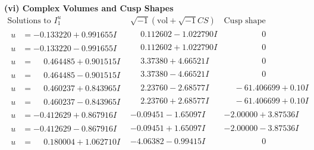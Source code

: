 \documentclass[1p]{elsarticle_modified}
\theoremstyle{definition}
\newcommand{\I}{\sqrt{-1}}
\begin{document}
\newpage\flushleft \textbf{(vi) Complex Volumes and Cusp Shapes}
$$\begin{array}{c|c|c}  
\text{Solutions to }I^u_{1}& \I (\text{vol} + \sqrt{-1}CS) & \text{Cusp shape}\\
 \hline 
\begin{aligned}
u &= -0.133220 + 0.991655 I\end{aligned}
 & \phantom{-}0.112602 - 1.022790 I & \phantom{-0.000000 } 0 \\ \hline\begin{aligned}
u &= -0.133220 - 0.991655 I\end{aligned}
 & \phantom{-}0.112602 + 1.022790 I & \phantom{-0.000000 } 0 \\ \hline\begin{aligned}
u &= \phantom{-}0.464485 + 0.901515 I\end{aligned}
 & \phantom{-}3.37380 + 4.66521 I & \phantom{-0.000000 } 0 \\ \hline\begin{aligned}
u &= \phantom{-}0.464485 - 0.901515 I\end{aligned}
 & \phantom{-}3.37380 - 4.66521 I & \phantom{-0.000000 } 0 \\ \hline\begin{aligned}
u &= \phantom{-}0.460237 + 0.843965 I\end{aligned}
 & \phantom{-}2.23760 - 2.68577 I & \phantom{-}                -6
1.406699 + 0. 10   I\phantom{ +0.000000I} \\ \hline\begin{aligned}
u &= \phantom{-}0.460237 - 0.843965 I\end{aligned}
 & \phantom{-}2.23760 + 2.68577 I & \phantom{-}                -6
1.406699 + 0. 10   I\phantom{ +0.000000I} \\ \hline\begin{aligned}
u &= -0.412629 + 0.867916 I\end{aligned}
 & -0.09451 - 1.65097 I & -2.00000 + 3.87536 I \\ \hline\begin{aligned}
u &= -0.412629 - 0.867916 I\end{aligned}
 & -0.09451 + 1.65097 I & -2.00000 - 3.87536 I \\ \hline\begin{aligned}
u &= \phantom{-}0.180004 + 1.062710 I\end{aligned}
 & -4.06382 - 0.99415 I & \phantom{-0.000000 } 0 \\ \hline\begin{aligned}

\end{aligned}
\end{array}$$
\end{document}
